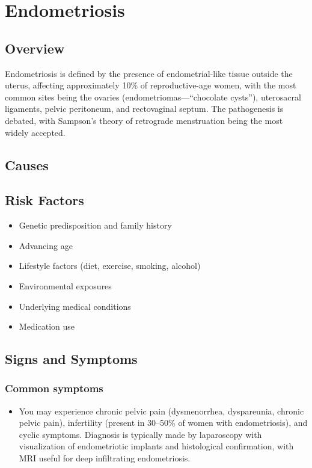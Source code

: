 \chapter{Endometriosis}
\label{sec:Endometriosis}

\section{Overview}
Endometriosis is defined by the presence of endometrial-like tissue outside the uterus, affecting approximately 10\% of reproductive-age women, with the most common sites being the ovaries (endometriomas---``chocolate cysts''), uterosacral ligaments, pelvic peritoneum, and rectovaginal septum. The pathogenesis is debated, with Sampson's theory of retrograde menstruation being the most widely accepted.
\section{Causes}
\section{Risk Factors}

\begin{itemize}[noitemsep]
  \item Genetic predisposition and family history
  \item Advancing age
  \item Lifestyle factors (diet, exercise, smoking, alcohol)
  \item Environmental exposures
  \item Underlying medical conditions
  \item Medication use
\end{itemize}
\section{Signs and Symptoms}

\subsection{Common symptoms}
\begin{itemize}[noitemsep]
  \item You may experience chronic pelvic pain (dysmenorrhea, dyspareunia, chronic pelvic pain), infertility (present in 30--50\% of women with endometriosis), and cyclic symptoms. Diagnosis is typically made by laparoscopy with visualization of endometriotic implants and histological confirmation, with MRI useful for deep infiltrating endometriosis. 
  \end{itemize}

